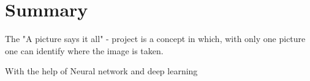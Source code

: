 \section{Summary}
The "A picture says it all" - project is a concept in which, with only one picture one can identify where the image is taken. 

With the help of Neural network and deep learning

